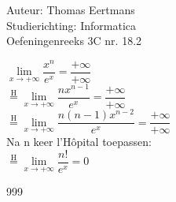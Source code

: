 \documentclass[a4paper]{article}
\begin{document}
  
\noindent \large Auteur: Thomas Eertmans \\
\noindent \large Studierichting: Informatica\\
\noindent \large Oefeningenreeks 3C nr. 18.2\\

\medskip

\normalsize

$\lim\limits_{x\rightarrow+\infty} \dfrac{x^n}{e^x} = \dfrac{+\infty}{+\infty}$ \\

$\overset{\mathrm{H}}{=} \lim\limits_{x\rightarrow+\infty} \dfrac{nx^{n-1}}{e^x} = \dfrac{+\infty}{+\infty}$ \\

$\overset{\mathrm{H}}{=} \lim\limits_{x\rightarrow+\infty} \dfrac{n(n-1)x^{n-2}}{e^x} = \dfrac{+\infty}{+\infty}$ \\

Na n keer l'Hôpital toepassen: \\

$\overset{\mathrm{H}}{=} \lim\limits_{x\rightarrow+\infty} \dfrac{n!}{e^x} = 0$

\begin{thebibliography}{999}
\end{thebibliography}
\end{document}
